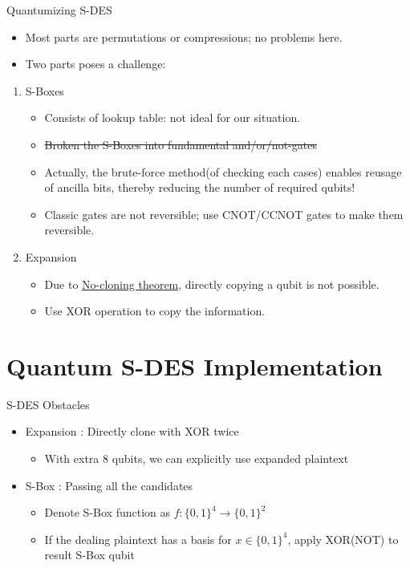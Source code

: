 \documentclass{beamer}
\begin{document}
	\begin{frame}{Quantumizing S-DES}
		\begin{itemize}
			\item Most parts are permutations or compressions; no problems here.
			\item Two parts poses a challenge:
		\end{itemize}
		\begin{enumerate}
			\item S-Boxes
			\begin{itemize}
				\item Consists of lookup table: not ideal for our situation.
				\item \sout{Broken the S-Boxes into fundamental and/or/not-gates}
				\item Actually, the brute-force method(of checking each cases) enables reusage of ancilla bits, thereby reducing the number of required qubits!
				\item Classic gates are not reversible; use CNOT/CCNOT gates to make them reversible.
				
			\end{itemize}
			\item Expansion
			\begin{itemize}
				\item Due to \href{https://en.wikipedia.org/wiki/No-cloning_theorem}{No-cloning theorem}, directly copying a qubit is not possible.
				\item Use XOR operation to copy the information.
			\end{itemize}
		\end{enumerate}
	\end{frame}
    
    \section{Quantum S-DES Implementation}
    
   	\begin{frame}{S-DES Obstacles}
   		\begin{itemize}
            \item Expansion : Directly clone with XOR twice
            \begin{itemize}
                \item With extra 8 qubits, we can explicitly use expanded plaintext
            \end{itemize}
            \item S-Box : Passing all the candidates
            \begin{itemize}
                \item Denote S-Box function as $ f : \{0,1\}^4 \to \{0,1\}^2 $
                \item If the dealing plaintext has a basis for $ x \in \{0, 1\}^4 $, apply XOR(NOT) to result S-Box qubit
            \end{itemize}
   		\end{itemize}
   	\end{frame}  
       
\end{document}
